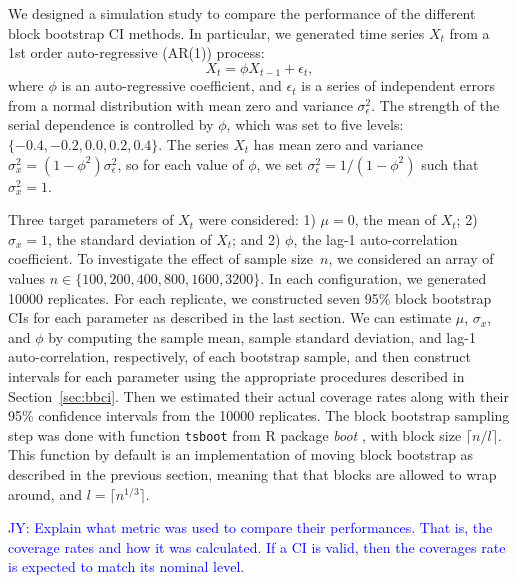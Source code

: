 \documentclass[12pt, letterpaper, titlepage]{article}
\newcommand{\jy}[1]{\textcolor{blue}{JY: #1}}
\begin{document}
We designed a simulation study to compare the performance of the different
block
bootstrap CI methods. In particular, we generated time series $X_t$
from a 1st order auto-regressive (AR(1)) process:
\[
X_t = \phi X_{t-1} + \epsilon_t,
\]
where $\phi$ is an auto-regressive coefficient, and $\epsilon_t$ is a series of
independent errors from a normal distribution with mean zero and variance
$\sigma_{\epsilon}^2$. The strength of the serial dependence is controlled by
$\phi$, which was set to five levels: $\{-0.4, -0.2, 0.0, 0.2, 0.4\}$.
The series $X_t$ has mean zero and variance
$\sigma_x^2 = (1 - \phi^2) \sigma_{\epsilon}^2$, so for each value of $\phi$,
we
set $\sigma_{\epsilon}^2 = 1 / (1 - \phi^2)$ such that $\sigma_x^2 = 1$.

Three target parameters of $X_t$ were considered:
1) $\mu = 0$, the mean of $X_t$;
2) $\sigma_x = 1$, the standard deviation of $X_t$; and
2) $\phi$, the lag-1 auto-correlation coefficient.
To investigate the effect of sample size~$n$, we considered an array of values
$n \in \{100, 200, 400, 800, 1600, 3200\}$. In each configuration, we generated 
10000 replicates. For each replicate, we constructed seven 95\% block bootstrap
CIs for each parameter as described in the last section. We can estimate 
$\mu$, $\sigma_x$, and $\phi$ by computing the sample mean, sample 
standard deviation,
and lag-1 auto-correlation, respectively, of each bootstrap sample, and then 
construct intervals for each parameter using the appropriate procedures
described in Section~\ref{sec:bbci}.
Then we estimated their actual coverage rates along with their 95\% confidence
intervals from the 10000 replicates. The block bootstrap sampling step was done
with function \texttt{tsboot} from R package \textsl{boot} \citep{boot}, with
block size $\lceil n / l \rceil$. This function by default is an implementation
of moving block bootstrap as described in the previous section, meaning that
that blocks are allowed to wrap around, and $l = \lceil n^{1/3} \rceil$.

\jy{Explain what metric was used to compare their performances. That is, the
  coverage rates and how it was calculated. If a CI is valid, then the coverages
  rate is expected to match its nominal level.}
\end{document}
